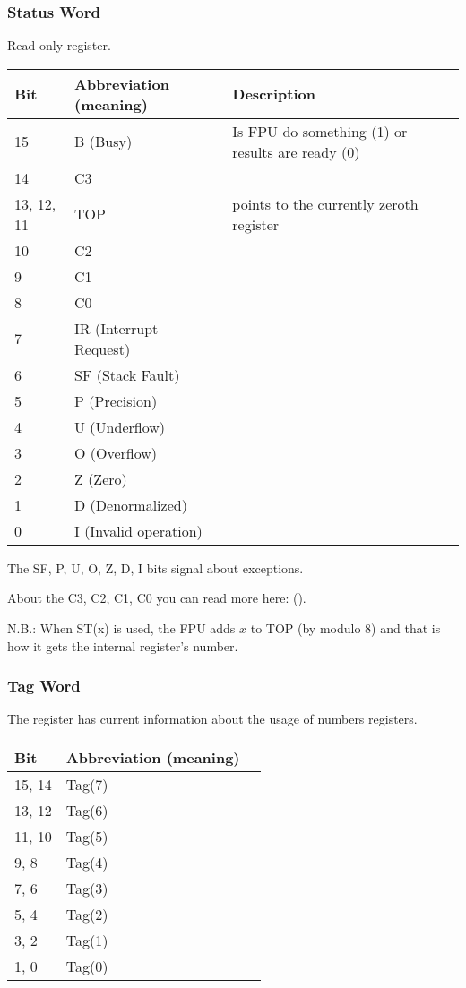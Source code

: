 \subsubsection{Status Word}

\label{FPU_status_word}
Read-only register.

\small
\begin{center}
\begin{tabular}{ | l | l | l | }
\hline
Bit &
Abbreviation (meaning) &
Description \\
\hline
15   & B (Busy) & Is FPU do something (1)
or results are ready (0) \\
\hline
14   & C3 & \\
\hline
13, 12, 11 & TOP & points to the currently zeroth register \\
\hline
10 & C2 & \\
\hline
9  & C1 & \\
\hline
8  & C0 & \\
\hline
7  & IR (Interrupt Request) & \\
\hline
6  & SF (Stack Fault) & \\
\hline
5  & P (Precision) & \\
\hline
4  & U (Underflow) & \\
\hline
3  & O (Overflow) & \\
\hline
2  & Z (Zero) & \\
\hline
1  & D (Denormalized) & \\
\hline
0  & I (Invalid operation) & \\
\hline
\end{tabular}
\end{center}
\normalsize

The SF, P, U, O, Z, D, I bits signal about exceptions.

About the C3, C2, C1, C0 you can read more here: ().

N.B.: When ST(x) is used, the FPU adds $x$ to TOP (by modulo 8) and that is how it gets 
the internal register's number.

\subsubsection{Tag Word}

The register has current information about the usage of numbers registers.

\begin{center}
\begin{tabular}{ | l | l | l | }
\hline
Bit & Abbreviation (meaning) \\
\hline
15, 14 & Tag(7) \\
\hline
13, 12 & Tag(6) \\
\hline
11, 10 & Tag(5) \\
\hline
9, 8 & Tag(4) \\
\hline
7, 6 & Tag(3) \\
\hline
5, 4 & Tag(2) \\
\hline
3, 2 & Tag(1) \\
\hline
1, 0 & Tag(0) \\
\hline
\end{tabular}
\end{center}

